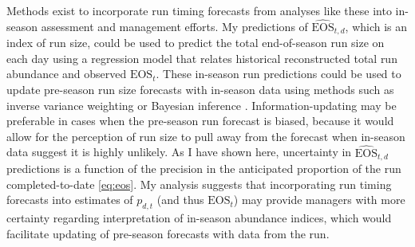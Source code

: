 \documentclass[12pt,]{book}
\theoremstyle{definition}
\theoremstyle{definition}
\theoremstyle{definition}
\theoremstyle{remark}
\begin{document}
Methods exist to incorporate run timing forecasts from analyses like
these into in-season assessment and management efforts. My predictions
of \(\widehat{\text{EOS}}_{t,d}\), which is an index of run size, could
be used to predict the total end-of-season run size on each day using a
regression model that relates historical reconstructed total run
abundance and observed \(\text{EOS}_t\). These in-season run predictions
could be used to update pre-season run size forecasts with in-season
data using methods such as inverse variance weighting
\citep[e.g.,][]{walters-buckingham-1975} or Bayesian inference
\citep[e.g.,][]{fried-hilborn-1988}. Information-updating may be
preferable in cases when the pre-season run forecast is biased, because
it would allow for the perception of run size to pull away from the
forecast when in-season data suggest it is highly unlikely. As I have
shown here, uncertainty in \(\widehat{\text{EOS}}_{t,d}\) predictions is
a function of the precision in the anticipated proportion of the run
completed-to-date \eqref{eq:eos}. My analysis suggests that incorporating
run timing forecasts into estimates of \(p_{d,t}\) (and thus
\(\text{EOS}_t\)) may provide managers with more certainty regarding
interpretation of in-season abundance indices, which would facilitate
updating of pre-season forecasts with data from the run.

\clearpage
\end{document}
